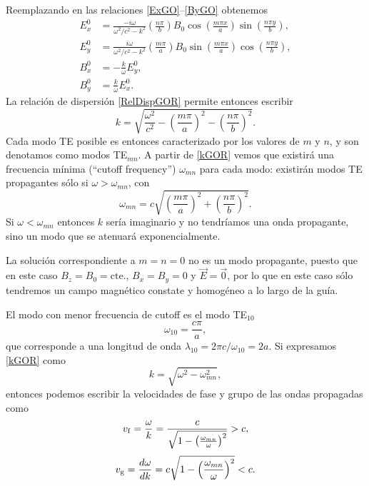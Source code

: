 Reemplazando en las relaciones \eqref{ExGO}--\eqref{ByGO} obtenemos
\begin{align}
    E^0_x &= \frac{-i\omega}{\omega^2/c^2 - k^2}\left(\frac{n \pi}{b}\right)  B_0\cos\left(\frac{m \pi x}{a}\right) \sin\left(\frac{n \pi y}{b}\right), \label{ExGOTE}\\
    E^0_y &= \frac{i\omega}{\omega^2/c^2 - k^2}\left(\frac{m \pi}{a}\right)  B_0\sin\left(\frac{m \pi x}{a}\right) \cos\left(\frac{n \pi y}{b}\right), \label{EyGOTE}\\
    B^0_x &= -\frac{k}{\omega}E^0_y, \label{BxGOTE}\\
    B^0_y &= \frac{k}{\omega}E^0_x. \label{ByGOTE}
\end{align}
La relación de dispersión \eqref{RelDispGOR} permite entonces escribir
\begin{equation}\label{kGOR}
k = \sqrt{\frac{\omega^2}{c^2} - \left(\frac{m \pi}{a}\right)^2 - \left(\frac{n \pi}{b}\right)^2}.
\end{equation}
Cada modo TE posible es entonces caracterizado por los valores de $m$ y $n$, y son denotamos como modos TE$_{mn}$. A partir de \eqref{kGOR} vemos que existirá una frecuencia mínima (``cutoff frequency'') $\omega_{mn}$ para cada modo: existirán modos TE propagantes sólo si $\omega>\omega_{mn}$, con
\begin{equation}
\omega_{mn} = c \sqrt{\left(\frac{m \pi}{a}\right)^2 + \left(\frac{n \pi}{b}\right)^2}.
\end{equation}
Si $\omega<\omega_{mn}$ entonces $k$ sería imaginario y no tendríamos una onda propagante, sino un modo que se atenuará exponencialmente.

La solución correspondiente a $m=n=0$ no es un modo propagante, puesto que en este caso $B_z=B_0=\text{cte.}$, $B_x=B_y=0$ y $\vec{E}=\vec{0}$, por lo que en este caso sólo tendremos un campo magnético constate y homogéneo a lo largo de la guía.

 El modo con menor frecuencia de cutoff es el modo TE$_{10}$
\begin{equation}
\omega_{10} = \frac{c \pi}{a},
\end{equation}
que corresponde a una longitud de onda $\lambda_{10}=2\pi c/\omega_{10}=2a$.
Si expresamos \eqref{kGOR} como
\begin{equation}
k = \sqrt{\omega^2 - \omega_{mn}^2},
\end{equation}
entonces podemos escribir la velocidades de fase y grupo de las ondas propagadas como
\begin{equation}
v_{\rm f} = \frac{\omega}{k} = \frac{c}{\sqrt{1 - \left(\frac{\omega_{mn}}{\omega}\right)^2}} > c,
\end{equation}
\begin{equation}
v_{\rm g} = \frac{d\omega}{dk} = c \sqrt{1 - \left(\frac{\omega_{mn}}{\omega}\right)^2} < c.
\end{equation}


